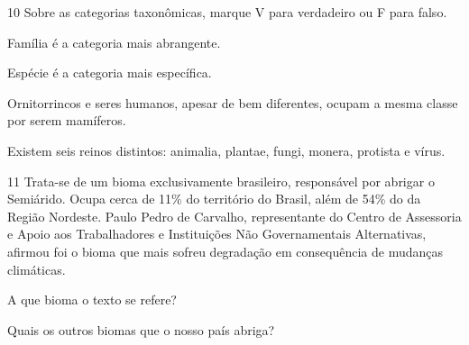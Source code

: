 

\num{10}  Sobre as categorias taxonômicas, marque V para verdadeiro ou F para falso.

\begin{boxlist}
\item Família é a categoria mais abrangente. 

\item Espécie é a categoria mais específica. 

\item Ornitorrincos e seres humanos, apesar de bem diferentes, ocupam a
mesma classe por serem mamíferos. 

\item Existem seis reinos distintos: animalia, plantae, fungi, monera,
protista e vírus. 
\end{boxlist}

\num{11}  Trata-se de um bioma exclusivamente brasileiro, responsável por abrigar o Semiárido. 
  Ocupa cerca de 11\% do território do Brasil, além de 54\% do da Região
  Nordeste. Paulo
  Pedro de Carvalho, representante do Centro de Assessoria e Apoio aos
  Trabalhadores e Instituições Não Governamentais Alternativas, afirmou foi o bioma que mais sofreu
  degradação em consequência de mudanças climáticas.


\begin{escolha}
\item A que bioma o texto se refere?



\item Quais os outros biomas que o nosso país abriga?


\end{escolha}

